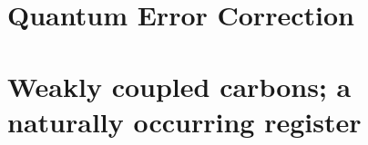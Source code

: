 

\section{Quantum Error Correction}



\section{Weakly coupled carbons; a naturally occurring register }





